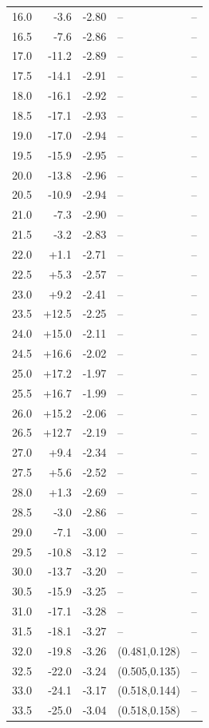 \documentclass[10pt,a4paper]{article}
\begin{document}
\begin{longtable}{@{}rrrp{55mm}p{55mm}@{}}
16.0 & -3.6 & -2.80 & -- & --\\
16.5 & -7.6 & -2.86 & -- & --\\
17.0 & -11.2 & -2.89 & -- & --\\
17.5 & -14.1 & -2.91 & -- & --\\
18.0 & -16.1 & -2.92 & -- & --\\
18.5 & -17.1 & -2.93 & -- & --\\
19.0 & -17.0 & -2.94 & -- & --\\
19.5 & -15.9 & -2.95 & -- & --\\
20.0 & -13.8 & -2.96 & -- & --\\
20.5 & -10.9 & -2.94 & -- & --\\
21.0 & -7.3 & -2.90 & -- & --\\
21.5 & -3.2 & -2.83 & -- & --\\
22.0 & +1.1 & -2.71 & -- & --\\
22.5 & +5.3 & -2.57 & -- & --\\
23.0 & +9.2 & -2.41 & -- & --\\
23.5 & +12.5 & -2.25 & -- & --\\
24.0 & +15.0 & -2.11 & -- & --\\
24.5 & +16.6 & -2.02 & -- & --\\
25.0 & +17.2 & -1.97 & -- & --\\
25.5 & +16.7 & -1.99 & -- & --\\
26.0 & +15.2 & -2.06 & -- & --\\
26.5 & +12.7 & -2.19 & -- & --\\
27.0 & +9.4 & -2.34 & -- & --\\
27.5 & +5.6 & -2.52 & -- & --\\
28.0 & +1.3 & -2.69 & -- & --\\
28.5 & -3.0 & -2.86 & -- & --\\
29.0 & -7.1 & -3.00 & -- & --\\
29.5 & -10.8 & -3.12 & -- & --\\
30.0 & -13.7 & -3.20 & -- & --\\
30.5 & -15.9 & -3.25 & -- & --\\
31.0 & -17.1 & -3.28 & -- & --\\
31.5 & -18.1 & -3.27 & -- & --\\
32.0 & -19.8 & -3.26 & (0.481,0.128) & --\\
32.5 & -22.0 & -3.24 & (0.505,0.135) & --\\
33.0 & -24.1 & -3.17 & (0.518,0.144) & --\\
33.5 & -25.0 & -3.04 & (0.518,0.158) & --\\

\end{longtable}
\end{document}
